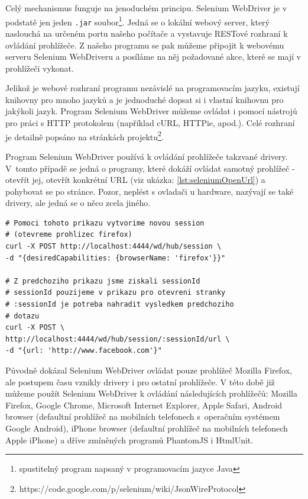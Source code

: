 \documentclass[thesis=M,czech]{FITthesis}[2013/05/10]
\begin{document}
Celý mechanismus funguje na jenoduchém principu. Selenium WebDriver je v podstatě jen jeden \verb|.jar| soubor\footnote{spustitelný program napsaný v programovacím jazyce Java}. Jedná se o lokální webový server, který naslouchá na určeném portu našeho počítače a vystavuje RESTové rozhraní k ovládání prohlížeče. Z našeho programu se pak můžeme připojit k webovému serveru Selenium WebDriveru a posíláme na něj požadované akce, které se mají v prohlížeči vykonat. 

Jelikož je webové rozhraní programu nezávislé na programovacím jazyku, existují knihovny pro mnoho jazyků a je jednoduché dopsat si i vlastní knihovnu pro jakýkoli jazyk. Program Selenium WebDriver můžeme ovládat i pomocí nástrojů pro práci s HTTP protokolem (například cURL, HTTPie, apod.). Celé rozhraní je detailně popsáno na stránkách projektu\footnote{https://code.google.com/p/selenium/wiki/JsonWireProtocol}.

Program Selenium WebDriver používá k ovládání prohlížeče takzvané drivery. V~tomto případě se jedná o programy, které dokáží ovládat samotný prohlížeč - otevřít jej, otevřít konkrétní URL (viz ukázka: \ref{lst:seleniumOpenUrl}) a pohybovat se po stránce. Pozor, neplést s ovladači u hardware, nazývají se také drivery, ale jedná se o něco zcela jiného. 

\begin{lstlisting}[caption={Příklad otevření URL v programu Selenium WebDriver pomocí cURL},label=lst:seleniumOpenUrl,belowcaptionskip=0.4cm]
# Pomoci tohoto prikazu vytvorime novou session 
# (otevreme prohlizec firefox)
curl -X POST http://localhost:4444/wd/hub/session \
-d "{desiredCapabilities: {browserName: 'firefox'}}"

# Z predchoziho prikazu jsme ziskali sessionId
# sessionId pouzijeme v prikazu pro otevreni stranky
# :sessionId je potreba nahradit vysledkem predchoziho
# dotazu
curl -X POST \
http://localhost:4444/wd/hub/session/:sessionId/url \
-d "{url: 'http://www.facebook.com'}" 
\end{lstlisting}

Původně dokázal Selenium WebDriver ovládat pouze prohlížeč Mozilla Firefox, ale postupem času vznikly drivery i pro ostatní prohlížeče. V této době již můžeme použít Selenium WebDriver k ovládání následujících prohlížečů: Mozilla Firefox, Google Chrome, Microsoft Internet Explorer, Apple Safari, Android browser (defaultní prohlížeč na mobilních telefonech s~operačním systémem Google Android), iPhone browser (defaultní prohlížeč na mobilních telefonech Apple iPhone) a dříve zmíněných programů PhantomJS i HtmlUnit. 
\end{document}
